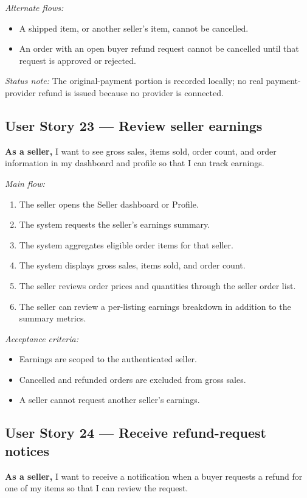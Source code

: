 \documentclass[11pt]{scrreprt}
\begin{document}
\textit{Alternate flows:}
\begin{itemize}
\item A shipped item, or another seller's item, cannot be cancelled.
\item An order with an open buyer refund request cannot be cancelled until that
request is approved or rejected.
\end{itemize}

\textit{Status note:} The original-payment portion is recorded locally; no real
payment-provider refund is issued because no provider is connected.

\subsection{User Story 23 --- Review seller earnings}
\textbf{As a seller,} I want to see gross sales, items sold, order count, and
order information in my dashboard and profile so that I can track earnings.

\textit{Main flow:}
\begin{enumerate}
\item The seller opens the Seller dashboard or Profile.
\item The system requests the seller's earnings summary.
\item The system aggregates eligible order items for that seller.
\item The system displays gross sales, items sold, and order count.
\item The seller reviews order prices and quantities through the seller order
list.
\item The seller can review a per-listing earnings breakdown in addition to
the summary metrics.
\end{enumerate}

\textit{Acceptance criteria:}
\begin{itemize}
\item Earnings are scoped to the authenticated seller.
\item Cancelled and refunded orders are excluded from gross sales.
\item A seller cannot request another seller's earnings.
\end{itemize}

\subsection{User Story 24 --- Receive refund-request notices}
\textbf{As a seller,} I want to receive a notification when a buyer requests
a refund for one of my items so that I can review the request.
\end{document}
